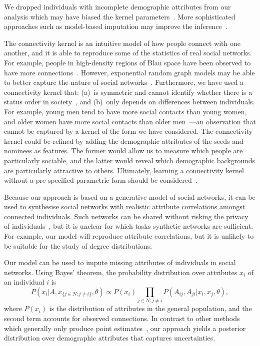 \documentclass{scrartcl}
\newcommand{\population}{N}
\begin{document}
We dropped individuals with incomplete demographic attributes from our analysis which may have biased the kernel parameters~\cite{Rubin1976}. %
More sophisticated approaches such as model-based imputation may improve the inference~\cite{Pigott2001}.

The connectivity kernel is an intuitive model of how people connect with one another, and it is able to reproduce some of the statistics of real social networks. For example, people in high-density regions of Blau space have been observed to have more connections~\cite{Currarini2009}. However, exponential random graph models may be able to better capture the nature of social networks~\cite{Wimmer2010}. Furthermore, we have used a connectivity kernel that: (a)~is symmetric and cannot identify whether there is a status order in society~\cite{Chan2004,Ball2013}, and (b)~only depends on  differences between individuals. For example, young men tend to have more social contacts than young women, and older women have more social contacts than older men~\cite{Bhattacharya2016}---an observation that cannot be captured by a kernel of the form we have considered. The connectivity kernel could be refined by adding the demographic attributes of the seeds and nominees as features. The former would allow us to measure which people are particularly sociable, and the latter would reveal which demographic backgrounds are particularly attractive to others. Ultimately, learning a connectivity kernel without a pre-specified parametric form should be considered~\cite{Frolich2006}.

Because our approach is based on a generative model of social networks, it can be used to synthesise social networks with realistic attribute correlations amongst connected individuals. Such networks can be shared without risking the privacy of individuals~\cite{Nettleton2016}, but it is unclear for which tasks synthetic networks are sufficient. For example, our model will reproduce attribute correlations, but it is unlikely to be suitable for the study of degree distributions.

Our model can be used to impute missing attributes of individuals in social networks. Using Bayes' theorem, the probability distribution over attributes $x_i$ of an individual $i$ is
\[
    P\left(x_i|A, x_{\{j\in \population:j \neq i\}}, \theta\right) \propto P(x_i) \prod_{j\in\population: j\neq i} P(A_{ij}, A_{ji}|x_i, x_j, \theta),
\]
where $P(x_i)$ is the distribution of attributes in the general population, and the second term accounts for observed connections. In contrast to other methods which generally only produce point estimates~\cite{Wang2013, Backstrom2010}, our approach yields a posterior distribution over demographic attributes that captures uncertainties.
\end{document}
